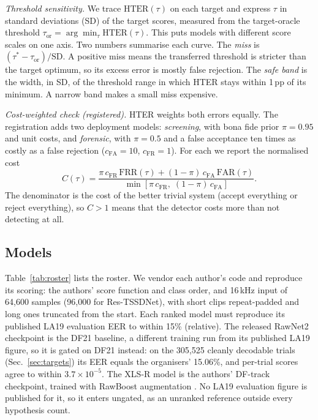 \documentclass[conference]{IEEEtran}
\newcommand{\hter}{\mathrm{HTER}}
\newcommand{\frr}{\mathrm{FRR}}
\newcommand{\far}{\mathrm{FAR}}
\newcommand{\tauor}{\tau_{\mathrm{or}}}
\begin{document}
\emph{Threshold sensitivity.} We trace \(\hter(\tau)\) on each target and
express \(\tau\) in standard deviations (SD) of the target scores, measured from
the target-oracle threshold \(\tauor=\arg\min_\tau \hter(\tau)\). This puts models
with different score scales on one axis. Two numbers summarise each curve. The
\emph{miss} is \((\tau^{*}-\tauor)/\mathrm{SD}\). A positive miss means the
transferred threshold is stricter than the target optimum, so its excess error
is mostly false rejection. The \emph{safe band} is the width, in SD, of the
threshold range in which HTER stays within 1\,pp of its minimum. A narrow band
makes a small miss expensive.

\emph{Cost-weighted check (registered).} HTER weights both errors equally. The
registration adds two deployment models: \emph{screening}, with bona fide prior
\(\pi=0.95\) and unit costs, and \emph{forensic}, with \(\pi=0.5\) and a false
acceptance ten times as costly as a false rejection (\(c_{\mathrm{FA}}=10\),
\(c_{\mathrm{FR}}=1\)). For each we report the normalised cost
\begin{equation}
C(\tau)=\frac{\pi\,c_{\mathrm{FR}}\,\frr(\tau)+(1-\pi)\,c_{\mathrm{FA}}\,\far(\tau)}
{\min\left[\pi\,c_{\mathrm{FR}},\;(1-\pi)\,c_{\mathrm{FA}}\right]}.
\label{eq:cost}
\end{equation}
The denominator is the cost of the better trivial system (accept everything or
reject everything), so \(C>1\) means that the detector costs more than not
detecting at all.

\subsection{Models}
\label{sec:models}
Table~\ref{tab:roster} lists the roster. We vendor each author's code and
reproduce its scoring: the authors' score function and class order, and 16\,kHz
input of 64,600 samples (96,000 for Res-TSSDNet), with short clips repeat-padded
and long ones truncated from the start. Each ranked model must reproduce its
published LA19 evaluation EER to within 15\% (relative). The released RawNet2
checkpoint is the DF21 baseline, a different training run from its published
LA19 figure, so it is gated on DF21 instead: on the 305,525 cleanly decodable
trials (Sec.~\ref{sec:targets}) its EER equals the organisers' 15.06\%, and
per-trial scores agree to within \(3.7{\times}10^{-5}\). The XLS-R model is the
authors' DF-track checkpoint, trained with RawBoost augmentation
\cite{tak22_rawboost}. No LA19 evaluation figure is published for it, so it
enters ungated, as an unranked reference outside every hypothesis count.
\end{document}
